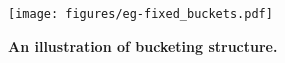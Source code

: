 \begin{figure}[htbp!]
  \centering
  \texttt{[image: figures/eg-fixed\_buckets.pdf]}
  \caption{\textbf{An illustration of bucketing structure.}}\label{fig:eg-bucketing}
\end{figure}
